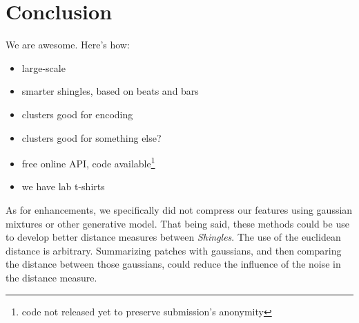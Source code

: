 \documentclass{article}
\begin{document}
\section{Conclusion}
We are awesome. Here's how:
\begin{itemize}
\item large-scale
\item smarter shingles, based on beats and bars
\item clusters good for encoding
\item clusters good for something else?
\item free online API, code available\footnote{code not released yet to preserve 
submission's anonymity}
\item we have lab t-shirts
\end{itemize}

As for enhancements, we specifically did not compress our features using
gaussian mixtures or other generative model. That being said, these methods
could be use to develop better distance measures between \textit{Shingles}.
The use of the euclidean distance is arbitrary. Summarizing patches
with gaussians, and then comparing the distance between those gaussians,
could reduce the influence of the noise in the distance measure.



\small



\end{document}
